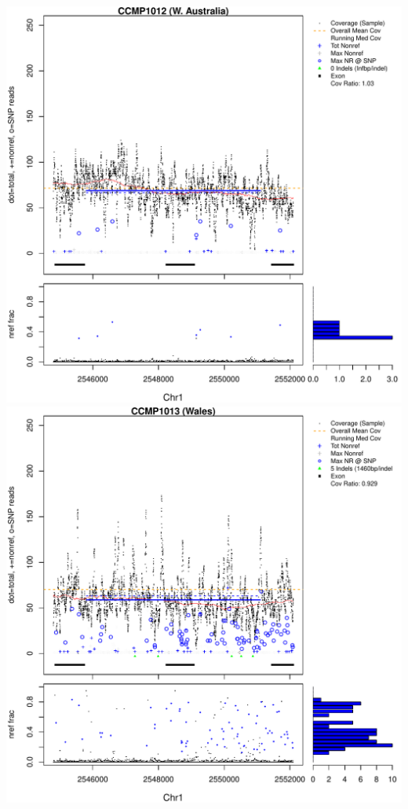 \documentclass{article}\usepackage[]{graphicx}\usepackage[]{color}
\makeatletter
\def\maxwidth{ %
  \ifdim\Gin@nat@width>\linewidth
    \linewidth
  \else
    \Gin@nat@width
  \fi
}
\newenvironment{knitrout}{}{} %
\makeatother
\begin{document}
\begin{knitrout}
{\includegraphics[width=\maxwidth]{figs-knitr/unnamed-chunk-49-3} 
\includegraphics[width=\maxwidth]{figs-knitr/unnamed-chunk-49-4} 
}
\end{knitrout}
\end{document}
